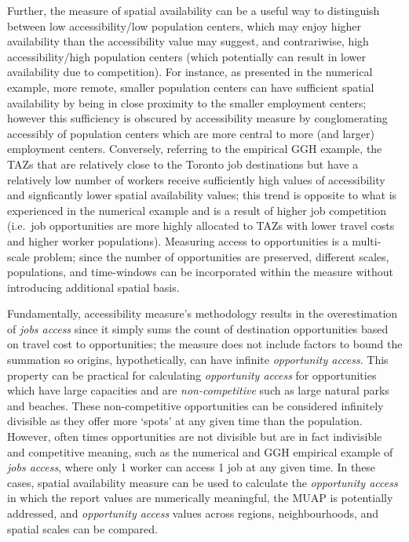 \documentclass[]{elsarticle} %
\begin{document}
Further, the measure of spatial availability can be a useful way to
distinguish between low accessibility/low population centers, which may
enjoy higher availability than the accessibility value may suggest, and
contrariwise, high accessibility/high population centers (which
potentially can result in lower availability due to competition). For
instance, as presented in the numerical example, more remote, smaller
population centers can have sufficient spatial availability by being in
close proximity to the smaller employment centers; however this
sufficiency is obscured by accessibility measure by conglomerating
accessibly of population centers which are more central to more (and
larger) employment centers. Conversely, referring to the empirical GGH
example, the TAZs that are relatively close to the Toronto job
destinations but have a relatively low number of workers receive
sufficiently high values of accessibility and signficantly lower spatial
availability values; this trend is opposite to what is experienced in
the numerical example and is a result of higher job competition
(i.e.~job opportunities are more highly allocated to TAZs with lower
travel costs and higher worker populations). Measuring access to
opportunities is a multi-scale problem; since the number of
opportunities are preserved, different scales, populations, and
time-windows can be incorporated within the measure without introducing
additional spatial basis.

Fundamentally, accessibility measure's methodology results in the
overestimation of \emph{jobs access} since it simply sums the count of
destination opportunities based on travel cost to opportunities; the
measure does not include factors to bound the summation so origins,
hypothetically, can have infinite \emph{opportunity access}. This
property can be practical for calculating \emph{opportunity access} for
opportunities which have large capacities and are \emph{non-competitive}
such as large natural parks and beaches. These non-competitive
opportunities can be considered infinitely divisible as they offer more
`spots' at any given time than the population. However, often times
opportunities are not divisible but are in fact indivisible and
competitive meaning, such as the numerical and GGH empirical example of
\emph{jobs access}, where only 1 worker can access 1 job at any given
time. In these cases, spatial availability measure can be used to
calculate the \emph{opportunity access} in which the report values are
numerically meaningful, the MUAP is potentially addressed, and
\emph{opportunity access} values across regions, neighbourhoods, and
spatial scales can be compared.
\end{document}

